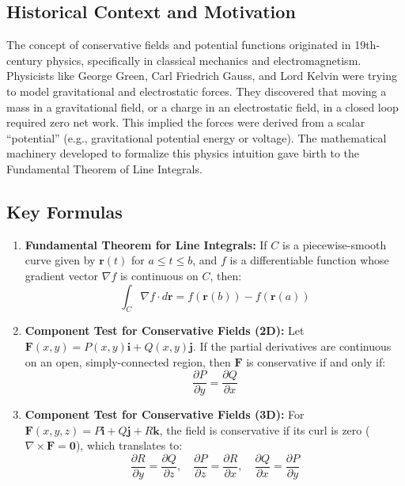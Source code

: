 \documentclass[12pt]{article}
\begin{document}
\subsection{Historical Context and Motivation}
The concept of conservative fields and potential functions originated in 19th-century physics, specifically in classical mechanics and electromagnetism. Physicists like George Green, Carl Friedrich Gauss, and Lord Kelvin were trying to model gravitational and electrostatic forces. They discovered that moving a mass in a gravitational field, or a charge in an electrostatic field, in a closed loop required zero net work. This implied the forces were derived from a scalar ``potential'' (e.g., gravitational potential energy or voltage). The mathematical machinery developed to formalize this physics intuition gave birth to the Fundamental Theorem of Line Integrals.

\subsection{Key Formulas}
\begin{enumerate}
    \item \textbf{Fundamental Theorem for Line Integrals:}
    If $C$ is a piecewise-smooth curve given by $\mathbf{r}(t)$ for $a \le t \le b$, and $f$ is a differentiable function whose gradient vector $\nabla f$ is continuous on $C$, then:
    \[
    \int_C \nabla f \cdot d\mathbf{r} = f(\mathbf{r}(b)) - f(\mathbf{r}(a))
    \]
    
    \item \textbf{Component Test for Conservative Fields (2D):}
    Let $\mathbf{F}(x, y) = P(x, y)\mathbf{i} + Q(x, y)\mathbf{j}$. If the partial derivatives are continuous on an open, simply-connected region, then $\mathbf{F}$ is conservative if and only if:
    \[
    \frac{\partial P}{\partial y} = \frac{\partial Q}{\partial x}
    \]

    \item \textbf{Component Test for Conservative Fields (3D):}
    For $\mathbf{F}(x, y, z) = P\mathbf{i} + Q\mathbf{j} + R\mathbf{k}$, the field is conservative if its curl is zero ($\nabla \times \mathbf{F} = \mathbf{0}$), which translates to:
    \[
    \frac{\partial R}{\partial y} = \frac{\partial Q}{\partial z}, \quad \frac{\partial P}{\partial z} = \frac{\partial R}{\partial x}, \quad \frac{\partial Q}{\partial x} = \frac{\partial P}{\partial y}
    \]
\end{enumerate}
\end{document}
